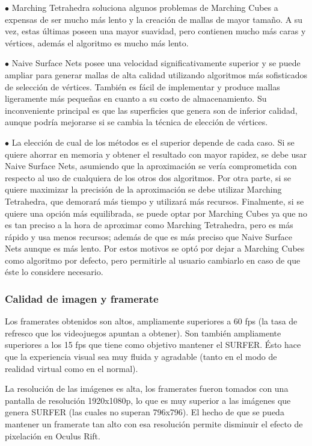 \documentclass[12pt]{article}
\begin{document}
$\bullet$ Marching Tetrahedra soluciona algunos problemas de Marching Cubes a expensas de ser mucho más lento y la creación de mallas de mayor tamaño. A su vez, estas últimas poseen una mayor suavidad, pero contienen mucho más caras y vértices, además  el algoritmo es mucho más lento.

$\bullet$ Naive Surface Nets posee una velocidad significativamente superior y se puede ampliar para generar mallas de alta calidad utilizando algoritmos más sofisticados de selección de vértices. También es fácil de implementar y produce mallas ligeramente más pequeñas en cuanto a su costo de almacenamiento. Su inconveniente principal es que las superficies que genera son de inferior calidad, aunque podría mejorarse si se cambia la técnica de elección de vértices. 

$\bullet$ La elección de cual de los métodos es el superior depende de cada caso. Si se quiere ahorrar en memoria y obtener el resultado con mayor rapidez, se debe usar Naive Surface Nets,  asumiendo que la aproximación se vería comprometida con respecto al uso de cualquiera de los otros dos algoritmos. Por otra parte, si se quiere maximizar la precisión de la aproximación se debe utilizar Marching Tetrahedra, que demorará más tiempo y utilizará más recursos. Finalmente, si se quiere una opción más equilibrada, se puede optar por Marching Cubes ya que no es tan preciso a la hora de aproximar como Marching Tetrahedra, pero es más rápido y usa menos recursos; además de que es más preciso que Naive Surface Nets aunque es más lento. Por estos motivos se optó por dejar a Marching Cubes como algoritmo por defecto, pero permitirle al usuario cambiarlo en caso de que éste lo considere necesario.

\subsubsection{Calidad de imagen y framerate}
\noindent Los framerates obtenidos son altos, ampliamente superiores a 60 fps (la tasa de refresco que los videojuegos apuntan a obtener). Son también ampliamente superiores a los 15 fps que tiene como objetivo mantener el SURFER. Ésto hace que la experiencia visual sea muy fluida y agradable (tanto en el modo de realidad virtual como en el normal). 

La resolución de las imágenes es alta, los framerates fueron tomados con una pantalla de resolución 1920x1080p, lo que es muy superior a las imágenes que genera SURFER (las cuales no superan 796x796). El hecho de que se pueda mantener un framerate tan alto con esa resolución permite disminuir el efecto de pixelación en Oculus Rift. 
\end{document}
